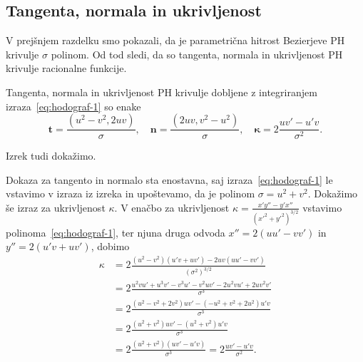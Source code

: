 \documentclass[isrm2, tisk]{fmfdelo}
\begin{document}
    \subsection{Tangenta, normala in ukrivljenost}
    V prejšnjem razdelku smo pokazali, da je parametrična hitrost Bezierjeve PH krivulje $\sigma$ polinom.
    Od tod sledi, da so tangenta, normala in ukrivljenost PH krivulje racionalne funkcije.
    \begin{izrek}
        Tangenta, normala in ukrivljenost PH krivulje dobljene z integriranjem izraza~\eqref{eq:hodograf-1} so enake
        \[\mathbf{t}=\frac{(u^2-v^2,2uv)}{\sigma}, \quad \mathbf{n}=\frac{(2uv,v^2-u^2)}{\sigma},\quad \mathbf{\kappa}=2\frac{uv'-u'v}{\sigma^2}.\]
    \end{izrek}
    \noindent Izrek tudi dokažimo.
    \begin{dokaz}
        Dokaza za tangento in normalo sta enostavna, saj izraza~\eqref{eq:hodograf-1} le vstavimo v izraza iz izreka in upoštevamo, da je polinom $\sigma = u^2+v^2$.
        Dokažimo še izraz za ukrivljenost $\kappa$.
        V enačbo za ukrivljenost  $\kappa = \frac{x'y''-y'x''}{(x'^2+y'^2)^{3/2}}$ vstavimo polinoma~\eqref{eq:hodograf-1}, ter njuna druga odvoda $x'' = 2(uu'-vv')$ in $y'' = 2(u'v+uv')$, dobimo
        \begin{align*}
            \kappa &= 2\frac{(u^2-v^2)(u'v+uv') - 2uv(uu'-vv')}{(\sigma^2)^{3/2}}\\
            &= 2\frac{u^2vu' + u^3v' - v^3u' - v^2uv' - 2u^2vu'+2uv^2v'}{\sigma^{3}} \\
            &= 2\frac{(u^2-v^2+2v^2)uv' - (-u^2+v^2+2u^2)u'v}{\sigma^{3}} \\
            &= 2\frac{(u^2+v^2)uv' - (u^2+v^2)u'v}{\sigma^{3}} \\
            &= 2\frac{(u^2+v^2)(uv' - u'v)}{\sigma^{3}} = 2\frac{uv' - u'v}{\sigma^{2}}.
        \end{align*}
    \end{dokaz}
\end{document}

